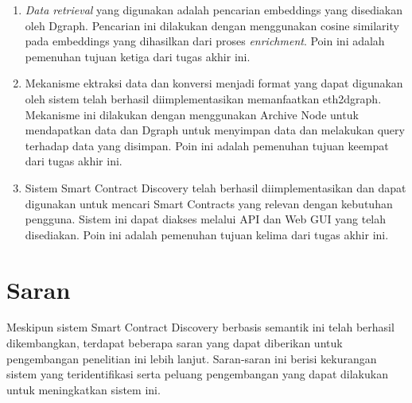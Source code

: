 \begin{enumerate}
    \item \textit{Data retrieval} yang digunakan adalah pencarian embeddings yang disediakan oleh Dgraph. Pencarian ini dilakukan dengan menggunakan cosine similarity pada embeddings yang dihasilkan dari proses \textit{enrichment}. Poin ini adalah pemenuhan tujuan ketiga dari tugas akhir ini.
    \item Mekanisme ektraksi data dan konversi menjadi format yang dapat digunakan oleh sistem telah berhasil diimplementasikan memanfaatkan eth2dgraph. Mekanisme ini dilakukan dengan menggunakan Archive Node untuk mendapatkan data dan Dgraph untuk menyimpan data dan melakukan query terhadap data yang disimpan. Poin ini adalah pemenuhan tujuan keempat dari tugas akhir ini.
    \item Sistem Smart Contract Discovery telah berhasil diimplementasikan dan dapat digunakan untuk mencari Smart Contracts yang relevan dengan kebutuhan pengguna. Sistem ini dapat diakses melalui API dan Web GUI yang telah disediakan. Poin ini adalah pemenuhan tujuan kelima dari tugas akhir ini.
\end{enumerate}
 
\section{Saran}
Meskipun sistem Smart Contract Discovery berbasis semantik ini telah berhasil dikembangkan, terdapat beberapa saran yang dapat diberikan untuk pengembangan penelitian ini lebih lanjut. Saran-saran ini berisi kekurangan sistem yang teridentifikasi serta peluang pengembangan yang dapat dilakukan untuk meningkatkan sistem ini.

